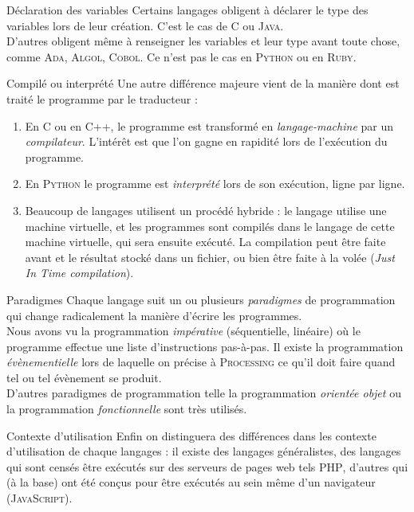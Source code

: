 \documentclass[10pt]{beamer}
\begin{document}
\begin{frame}{Déclaration des variables}
Certains langages obligent à déclarer le type des variables lors de leur création. C'est le cas de \textsc{C} ou \textsc{Java}.\\\pause
D'autres obligent même à renseigner les variables et leur type avant toute chose, comme \textsc{Ada}, \textsc{Algol}, \textsc{Cobol}. Ce n'est pas le cas en \textsc{Python} ou en \textsc{Ruby}.\\
\end{frame}
\begin{frame}{Compilé ou interprété}
Une autre différence majeure vient de la manière dont est traité le programme par le traducteur :\pause

\begin{enumerate}[\textbullet]
	\item 	En \textsc{C} ou en \textsc{C++}, le programme est transformé en \textit{langage-machine} par un \textit{compilateur}. L'intérêt est que l'on gagne en rapidité lors de l'exécution du programme.\pause
	\item 	En \textsc{Python} le programme est \textit{interprété}  lors de son exécution, ligne par ligne.\pause
	\item 	Beaucoup de langages utilisent un procédé hybride : le langage utilise une machine virtuelle, et les programmes sont compilés dans le langage de cette machine virtuelle, qui sera ensuite exécuté. La compilation peut être faite avant et le résultat stocké dans un fichier, ou bien être faite à la volée (\textit{Just In Time compilation}).\pause
\end{enumerate}
\end{frame}


\begin{frame}{Paradigmes}
Chaque langage suit un ou plusieurs \textit{paradigmes} de programmation qui change radicalement la manière d'écrire les programmes.\\\pause
Nous avons vu la programmation \textit{impérative} (séquentielle, linéaire) où le programme effectue une liste d'instructions pas-à-pas. Il existe la programmation \textit{évènementielle} lors de laquelle on précise à \textsc{Processing} ce qu'il doit faire quand tel ou tel évènement se produit.\\\pause
D'autres paradigmes de programmation telle la programmation \textit{orientée objet} ou la programmation \textit{fonctionnelle} sont très utilisés.

\end{frame}
\begin{frame}{Contexte d'utilisation}
Enfin on distinguera des différences dans les contexte d'utilisation de chaque langages : il existe des langages généralistes, des langages qui sont censés être exécutés sur des \og serveurs de pages web\fg{} tels \textsc{PHP}, d'autres qui (à la base) ont été conçus pour être exécutés au sein même d'un navigateur (\textsc{JavaScript}).
\end{frame}
\end{document}
